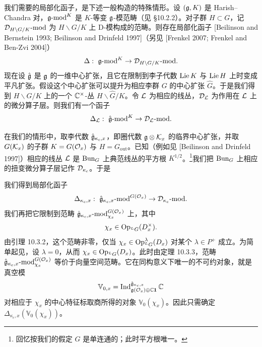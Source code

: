 我们需要的局部化函子，是下述一般构造的特殊情形。设 $(\mathfrak{g},K)$ 是 Harish--Chandra 对，$\mathfrak{g}\text{-mod}^K$ 是 $K$-等变 $\mathfrak{g}$-模范畴（见 §10.2.2）。对子群 $H\subset G$，记 $\mathcal{D}_{H\backslash G/K}\text{-mod}$ 为 $H\backslash G/K$ 上 D-模构成的范畴。则存在局部化函子 [Beilinson and Bernstein 1993; Beilinson and Drinfeld 1997]（另见 [Frenkel 2007; Frenkel and Ben-Zvi 2004]）
\[
    \Delta:\ \mathfrak{g}\text{-mod}^K \to \mathcal{D}_{H\backslash G/K}\text{-mod}.
\]
现在设 $\hat{\mathfrak{g}}$ 是 $\mathfrak{g}$ 的一维中心扩张，且它在限制到李子代数 $\operatorname{Lie} K$ 与 $\operatorname{Lie} H$ 上时变成平凡扩张。假设这个中心扩张可以提升为相应李群 $G$ 的中心扩张 $\hat{G}$。于是我们得到 $H\backslash G/K$ 上的一个 $\mathbb{C}^\times$-丛 $H\backslash\hat{G}/K$。令 $\mathcal{L}$ 为相应的线丛，$\mathcal{D}_{\mathcal{L}}$ 为作用在 $\mathcal{L}$ 上的微分算子层。则我们有一个函子
\[
    \Delta_{\mathcal{L}}:\ \hat{\mathfrak{g}}\text{-mod}^K \to \mathcal{D}_{\mathcal{L}}\text{-mod}.
\]

在我们的情形中，取李代数 $\hat{\mathfrak{g}}_{\kappa_c,x}$，即圈代数 $\mathfrak{g}\otimes\mathcal{K}_x$ 的临界中心扩张，并取 $G(\mathcal{K}_x)$ 的子群 $K=G(\mathcal{O}_x)$ 与 $H=G_{\mathrm{out}}$。已知（例如见 [Beilinson and Drinfeld 1997]）相应的线丛 $\mathcal{L}$ 是 $\operatorname{Bun}_G$ 上典范线丛的平方根 $K^{1/2}$。\footnote{回忆按我们的假定 $G$ 是单连通的；此时平方根唯一。}我们把 $\operatorname{Bun}_G$ 上相应的扭变微分算子层记作 $\mathcal{D}_{\kappa_c}$。于是

我们得到局部化函子
\[
    \Delta_{\kappa_c,x}:\ \gghat_{\kappa_c,x}\text{-mod}^{G(\cO_x)}
    \to \cD_{\kappa_c}\text{-mod}.
\]
我们再把它限制到范畴 $\hat{\mathfrak{g}}_{\kappa_c,x}\text{-mod}^{G(\mathcal{O}_x)}_{\chi_x}$ 上，其中
\[
    \chi_x\in\operatorname{Op}_{{}^L G}(D^\times_x).
\]
由引理 10.3.2，这个范畴非零，仅当 $\chi_x\in\operatorname{Op}^{\lambda}_{{}^L G}(D_x)$ 对某个 $\lambda\in P^+$ 成立。为简单起见，设 $\lambda=0$，从而 $\chi_x\in\operatorname{Op}_{{}^L G}(D_x)$。此时由定理 10.3.3，范畴 $\hat{\mathfrak{g}}_{\kappa_c,x}\text{-mod}^{G(\mathcal{O}_x)}_{\chi_x}$ 等价于向量空间范畴。它在同构意义下唯一的不可约对象，就是真空模
\[
    \mathbb{V}_{0,x} = \operatorname{Ind}^{\hat{\mathfrak{g}}_{\kappa_c,x}}_{\mathfrak{g}(\mathcal{O}_x)\oplus\mathbb{C}\mathbf{1}}\mathbb{C}
\]
对相应于 $\chi_x$ 的中心特征标取商所得的对象 $\mathbb{V}_0(\chi_x)$。因此只需确定 $\Delta_{\kappa_c,x}(\mathbb{V}_0(\chi_x))$。

